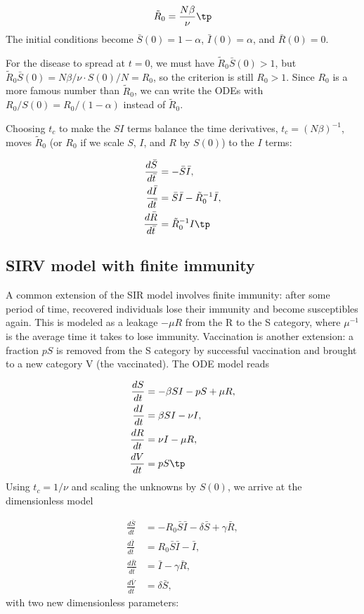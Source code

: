 \documentclass[graybox,envcountchap,sectrefs,final]{svmonodo}
\begin{document}
\begin{equation}
\tilde R_0 = \frac{N\beta}{\nu}\tp
\end{equation}
The initial conditions become $\bar S(0)=1-\alpha$, $\bar I(0)=\alpha$,
and $\bar R(0)=0$.

For the disease to spread at $t=0$, we must have $\tilde R_0 \bar S(0) > 1$,
but $\tilde R_0 \bar S(0) = N\beta/\nu \cdot S(0)/N = R_0$, so the
criterion is still $R_0 > 1$. Since $R_0$ is a more famous number than
$\tilde R_0$, we can write the ODEs with $R_0/S(0) = R_0/(1-\alpha)$
instead of $\tilde R_0$.

Choosing $t_c$ to make the $SI$ terms balance the time derivatives,
$t_c = (N\beta)^{-1}$, moves $\tilde R_0$ (or $R_0$ if we scale
$S$, $I$, and $R$ by $S(0)$) to the $I$ terms:

\begin{align*}
\frac{d\bar S}{d\bar t} &= - \bar S\bar I,
\\ 
\frac{d\bar I}{d\bar t} &= \bar S\bar I - \tilde R_0^{-1} \bar I,
\\ 
\frac{d\bar R}{d\bar t} &= \tilde R_0^{-1} I\tp
\end{align*}

\subsection{SIRV model with finite immunity}

A common extension of the SIR model involves finite immunity: after
some period of time, recovered individuals lose their immunity
and become susceptibles again. This is modeled as
a leakage $-\mu R$ from the R to the S category, where $\mu^{-1}$
is the average time it takes to lose immunity.
Vaccination is another extension: a fraction $pS$ is removed from the
S category by successful vaccination and brought to a new category V (the
vaccinated). The ODE model reads

\begin{align}
\frac{dS}{dt} &= - \beta SI - pS + \mu R,
\label{scale:SIRV:S}\\ 
\frac{dI}{dt} &= \beta SI - \nu I,
\label{scale:SIRV:I}\\ 
\frac{dR}{dt} &= \nu I -\mu R,
\label{scale:SIRV:R}\\ 
\frac{dV}{dt} &= p S\tp
\label{scale:SIRV:V}
\end{align}
Using $t_c=1/\nu$ and scaling the unknowns by $S(0)$, we arrive at
the dimensionless model

\begin{align}
\frac{d\bar S}{d\bar t} &= - R_0 \bar S \bar I - \delta \bar S + \gamma \bar R,
\label{scale:SIRV:S2}\\ 
\frac{d\bar I}{d\bar t} &= R_0 \bar S \bar I - \bar I,
\label{scale:SIRV:I2}\\ 
\frac{d\bar R}{d\bar t} &= \bar I -\gamma \bar R,
\label{scale:SIRV:R2}\\ 
\frac{d\bar V}{d\bar t} &= \delta \bar S,
\label{scale:SIRV:V2}
\end{align}
with two new dimensionless parameters:
\end{document}
